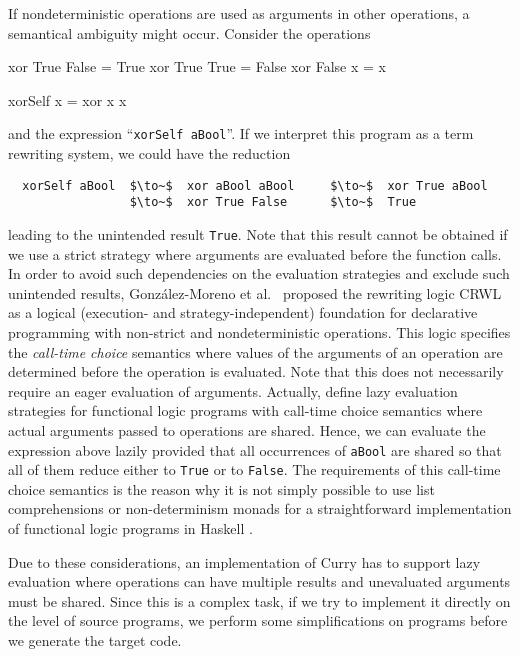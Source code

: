 \documentclass{llncs}
\newcommand{\code}[1]{\mbox{\small\texttt{#1}}}
\newcommand{\ccode}[1]{``\code{#1}''}
\begin{document}
If nondeterministic operations are used as arguments in other operations,
a semantical ambiguity might occur. Consider the operations
%
\begin{curry}
  xor True  False = True
  xor True  True  = False
  xor False x     = x

  xorSelf x = xor x x
\end{curry}
%
and the expression \ccode{xorSelf aBool}.
If we interpret this program as a term rewriting system,
we could have the reduction
\begin{lstlisting}
  xorSelf aBool  $\to~$  xor aBool aBool     $\to~$  xor True aBool 
                 $\to~$  xor True False      $\to~$  True
\end{lstlisting}
leading to the unintended result \code{True}.
Note that this result cannot be obtained if we use a strict strategy
where arguments are evaluated before the function calls.
In order to avoid such dependencies on the evaluation strategies
and exclude such unintended results,
Gonz\'alez-Moreno et al.\ \cite{GonzalezEtAl99} proposed
the rewriting logic CRWL as a logical
(execution- and strategy-independent) foundation for declarative
programming with non-strict and nondeterministic operations.  This
logic specifies the \emph{call-time choice} semantics \cite{Hussmann92}
\label{ctc-semantics}
where values of the arguments of an operation are determined before the
operation is evaluated. Note that this does not necessarily require
an eager evaluation of arguments.
Actually, \cite{AlbertHanusHuchOliverVidal05,LopezRodriguezSanchez07}
define lazy evaluation strategies for functional logic programs
with call-time choice semantics where actual arguments passed to
operations are shared. Hence, we can evaluate the expression above
lazily provided that all occurrences of \code{aBool}
are shared so that all of them reduce either to \code{True} or to \code{False}.
The requirements of this call-time choice semantics is the
reason why it is not simply possible to use list comprehensions
or non-determinism monads for a straightforward implementation
of functional logic programs in Haskell \cite{FischerKiselyovShan09}.

Due to these considerations, an implementation of Curry
has to support lazy evaluation where operations can have multiple results
and unevaluated arguments must be shared.
Since this is a complex task, if we try to implement it
directly on the level of source programs,
we perform some simplifications on programs before we generate the target code.
\end{document}
